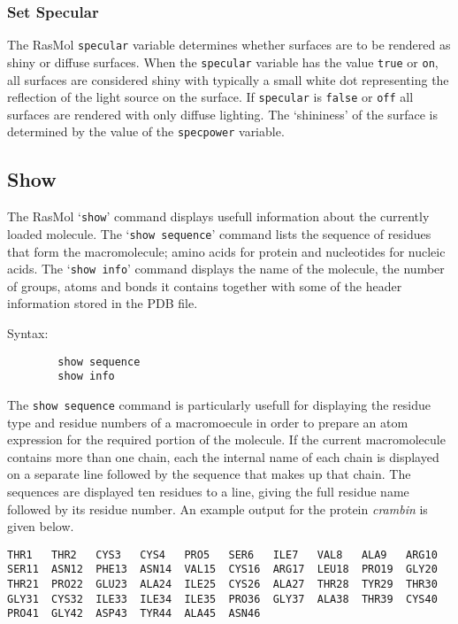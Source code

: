 \subsubsection*{Set Specular}
The RasMol {\tt specular} variable determines whether surfaces are to be
rendered as shiny or diffuse surfaces. When the {\tt specular} variable 
has the value {\tt true} or {\tt on}, all surfaces are considered shiny
with typically a small white dot representing the reflection of the light
source on the surface. If {\tt specular} is {\tt false} or {\tt off} all
surfaces are rendered with only diffuse lighting. The `shininess' of the
surface is determined by the value of the {\tt specpower} variable.


\subsection{Show}
\label{CShow}

The RasMol `{\tt show}' command displays usefull information about the
currently loaded molecule. The `{\tt show sequence}' command lists the 
sequence of residues that form the macromolecule; amino acids for protein 
and nucleotides for nucleic acids. The `{\tt show info}' command displays
the name of the molecule, the number of groups, atoms and bonds it contains
together with some of the header information stored in the PDB file.


Syntax:
\begin{verbatim}
        show sequence
        show info
\end{verbatim}

The {\tt show sequence} command is particularly usefull for displaying the
residue type and residue numbers of a macromoecule in order to prepare an
atom expression for the required portion of the molecule. If the current
macromolecule contains more than one chain, each the internal name of each
chain is displayed on a separate line followed by the sequence that makes 
up that chain. The sequences are displayed ten residues to a line, giving 
the full residue name followed by its residue number. An example output
for the protein {\em crambin} is given below.

\begin{small}
\begin{verbatim}
THR1   THR2   CYS3   CYS4   PRO5   SER6   ILE7   VAL8   ALA9   ARG10  
SER11  ASN12  PHE13  ASN14  VAL15  CYS16  ARG17  LEU18  PRO19  GLY20  
THR21  PRO22  GLU23  ALA24  ILE25  CYS26  ALA27  THR28  TYR29  THR30  
GLY31  CYS32  ILE33  ILE34  ILE35  PRO36  GLY37  ALA38  THR39  CYS40  
PRO41  GLY42  ASP43  TYR44  ALA45  ASN46  
\end{verbatim}
\end{small}

